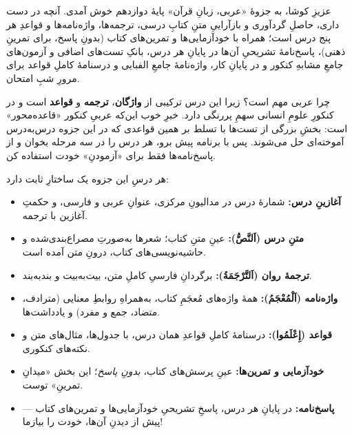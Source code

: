 
\begin{JNass}
عزیزِ کوشا، به جزوهٔ «عربی، زبانِ قرآن» پایهٔ دوازدهم خوش آمدی. آنچه در دست
داری، حاصلِ گردآوری و بازآراییِ متنِ کتابِ درسی، ترجمه‌ها، واژه‌نامه‌ها و
قواعدِ هر پنج درس است؛ همراه با خودآزمایی‌ها و تمرین‌های کتاب (بدونِ پاسخ،
برای تمرینِ ذهنی)، پاسخ‌نامهٔ تشریحیِ آن‌ها در پایانِ هر درس، بانکِ تست‌های
اضافی و آزمون‌های جامعِ مشابهِ کنکور و در پایانِ کار، واژه‌نامهٔ جامعِ
الفبایی و درسنامهٔ کاملِ قواعد برای مرورِ شبِ امتحان.
\end{JNass}

چرا عربی مهم است؟ زیرا این درس ترکیبی از \textbf{واژگان}، \textbf{ترجمه} و
\textbf{قواعد} است و در کنکورِ علومِ انسانی سهمِ پررنگی دارد. خبرِ خوب این‌که
عربیِ کنکور «قاعده‌محور» است: بخشِ بزرگی از تست‌ها با تسلط بر همین قواعدی که
در این جزوه درس‌به‌درس آموخته‌ای حل می‌شوند. پس با برنامه پیش برو، هر درس را
در سه مرحله بخوان و از پاسخ‌نامه‌ها فقط برای «آزمودنِ» خودت استفاده کن.

هر درسِ این جزوه یک ساختارِ ثابت دارد:

\begin{itemize}
  \item \textbf{آغازینِ درس:} شمارهٔ درس در مدالیونِ مرکزی، عنوانِ عربی و فارسی،
        و حکمتِ آغازین با ترجمه.
  \item \textbf{متنِ درس (اَلنَّصُّ):} عینِ متنِ کتاب؛ شعرها به‌صورتِ مصراع‌بندی‌شده
        و حاشیه‌نویسی‌های کتاب، درونِ متن آمده است.
  \item \textbf{ترجمهٔ روان (اَلتَّرْجَمَةُ):} برگردانِ فارسیِ کاملِ متن، بیت‌به‌بیت
        و بندبه‌بند.
  \item \textbf{واژه‌نامه (اَلْمُعْجَمُ):} همهٔ واژه‌های مُعجَمِ کتاب، به‌همراهِ
        روابطِ معنایی (مترادف، متضاد، جمع و مفرد) و یادداشت‌ها.
  \item \textbf{قواعد (إِعْلَمُوا):} درسنامهٔ کاملِ قواعدِ همان درس، با جدول‌ها،
        مثال‌های متن و نکته‌های کنکوری.
  \item \textbf{خودآزمایی و تمرین‌ها:} عینِ پرسش‌های کتاب، \emph{بدونِ پاسخ}؛
        این بخش «میدانِ تمرینِ» توست.
  \item \textbf{پاسخ‌نامه:} در پایانِ هر درس، پاسخِ تشریحیِ خودآزمایی‌ها و
        تمرین‌های کتاب — پیش از دیدنِ آن‌ها، خودت را بیازما!
\end{itemize}

